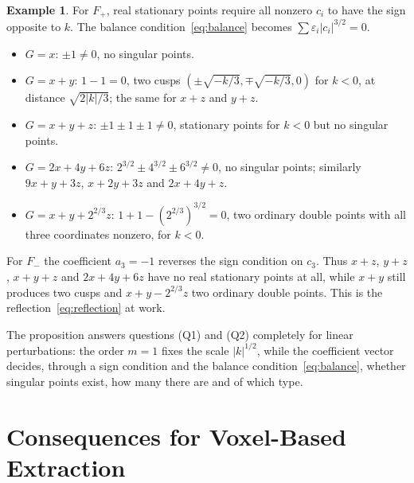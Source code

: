 \documentclass[12pt, a4paper, oneside]{book}
\theoremstyle{plain}
\theoremstyle{definition}
\newtheorem{example}[theorem]{Example}
\theoremstyle{remark}
\begin{document}
\begin{example}
\label{ex:linear-cases}
For $F_+$, real stationary points require all nonzero $c_i$ to have the sign
opposite to $k$. The balance condition~\eqref{eq:balance} becomes
$\sum\varepsilon_i|c_i|^{3/2}=0$.
\begin{itemize}
    \item $G=x$: $\pm1\neq0$, no singular points.
    \item $G=x+y$: $1-1=0$, two cusps $(\pm\sqrt{-k/3},\mp\sqrt{-k/3},0)$ for $k<0$,
          at distance $\sqrt{2|k|/3}$; the same for $x+z$ and $y+z$.
    \item $G=x+y+z$: $\pm1\pm1\pm1\neq0$, stationary points for $k<0$ but no
          singular points.
    \item $G=2x+4y+6z$: $2^{3/2}\pm4^{3/2}\pm6^{3/2}\neq0$, no singular points;
          similarly $9x+y+3z$, $x+2y+3z$ and $2x+4y+z$.
    \item $G=x+y+2^{2/3}z$: $1+1-(2^{2/3})^{3/2}=0$, two ordinary double points
          with all three coordinates nonzero, for $k<0$.
\end{itemize}
For $F_-$ the coefficient $a_3=-1$ reverses the sign condition on $c_3$. Thus
$x+z$, $y+z$, $x+y+z$ and $2x+4y+6z$ have no real stationary points at all,
while $x+y$ still produces two cusps and $x+y-2^{2/3}z$ two ordinary double
points. This is the reflection~\eqref{eq:reflection} at work.
\end{example}

The proposition answers questions (Q1) and (Q2) completely for linear
perturbations: the order $m=1$ fixes the scale $|k|^{1/2}$, while the
coefficient vector decides, through a sign condition and the balance
condition~\eqref{eq:balance}, whether singular points exist, how many there are
and of which type.

\section{Consequences for Voxel-Based Extraction}
\label{sec:voxel-consequences}
\end{document}
